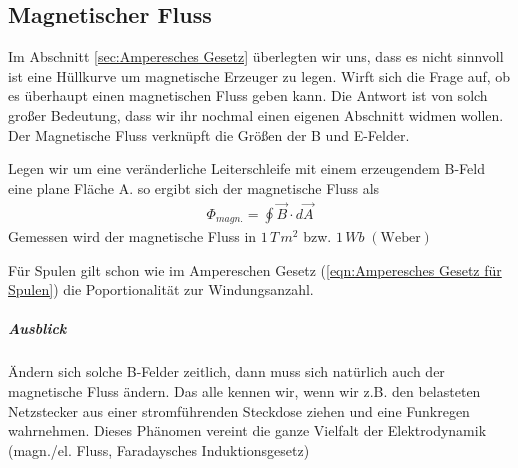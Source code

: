 \subsection{Magnetischer Fluss}
Im Abschnitt \ref{sec:Amperesches Gesetz} überlegten wir uns, dass es nicht sinnvoll ist eine Hüllkurve um magnetische Erzeuger zu legen. Wirft sich die Frage auf, ob es überhaupt einen magnetischen Fluss geben kann. Die Antwort ist von solch großer Bedeutung, dass wir ihr nochmal einen eigenen Abschnitt widmen wollen. 
Der Magnetische Fluss verknüpft die Größen der B und E-Felder.

Legen wir um eine veränderliche Leiterschleife mit einem erzeugendem B-Feld eine plane Fläche A. so ergibt sich der magnetische Fluss als
\begin{align} \label{eqn:magn. fluss}
\boxed{\Phi_{magn.} = \oint \limits \vec{B} \cdot d\vec{A}}
\end{align}
Gemessen wird der magnetische Fluss in $1\, T  \, m^2$ bzw. $1 \, Wb \; \mathrm{(Weber)}$

Für Spulen gilt schon wie im Ampereschen Gesetz (\ref{eqn:Amperesches Gesetz für Spulen}) die Poportionalität zur Windungsanzahl.
\subparagraph{Ausblick} Ändern sich solche B-Felder zeitlich, dann muss sich natürlich auch der magnetische Fluss ändern. Das alle kennen wir, wenn wir z.B. den belasteten  Netzstecker aus einer stromführenden Steckdose ziehen und eine Funkregen wahrnehmen. Dieses Phänomen vereint die ganze Vielfalt der Elektrodynamik (magn./el. Fluss, Faradaysches Induktionsgesetz)

